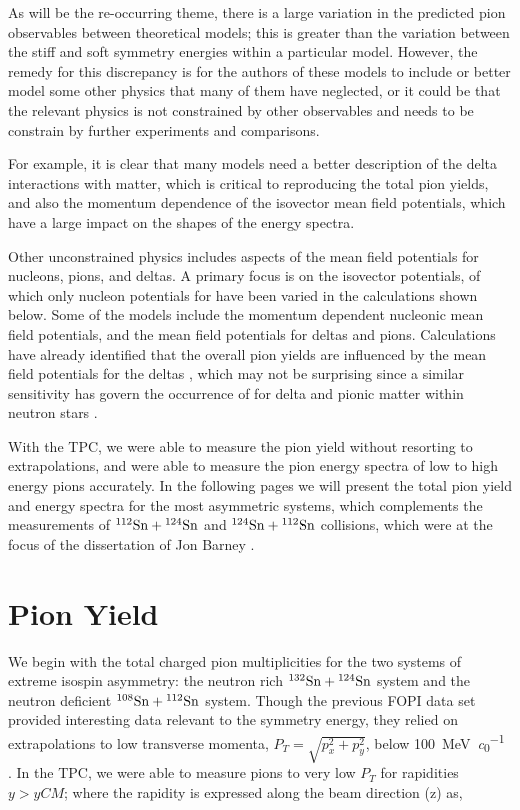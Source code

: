 As will be the re-occurring theme, there is a large variation in the predicted pion observables between theoretical models; this is greater than the variation between the stiff and soft symmetry energies within a particular model. However, the remedy for this discrepancy is for the authors of these models to include or better model some other physics that many of them have neglected, or it could be that the relevant physics is not constrained by other observables and needs to be constrain by further experiments and comparisons.

For example, it is clear that many models need a  better description of the delta interactions with matter, which is critical to reproducing the total pion yields, and also the momentum dependence of the isovector mean field potentials, which have a large impact on the shapes of the energy spectra. 

Other unconstrained physics includes aspects of the mean field potentials for nucleons, pions, and deltas. A primary focus is on the isovector potentials, of which only nucleon potentials for have been varied in the calculations shown below. Some of the models include the momentum dependent nucleonic mean field potentials, and the mean field potentials for deltas and pions. Calculations have already identified that the overall pion yields are influenced by the mean field potentials for the deltas \cite{cozmaPC}, which may not be surprising since a similar sensitivity has govern the occurrence of for delta and pionic matter within neutron stars \cite{deltaNS,pionNS}.  

With the \spirit TPC, we were able to measure the pion yield without resorting to extrapolations, and were able to measure the pion energy spectra of low to high energy pions accurately. In the following pages we will present the total pion yield and energy spectra for the most asymmetric systems, which complements the measurements of ${}^{112}\mathrm{Sn} + {}^{124}\mathrm{Sn}$ and ${}^{124}\mathrm{Sn} + {}^{112}\mathrm{Sn}$ collisions, which were at the focus of the dissertation of Jon Barney \cite{jon}.


\section{Pion Yield}

We begin with the total charged pion multiplicities for the two systems of extreme isospin asymmetry: the neutron rich ${}^{132}\mathrm{Sn} + {}^{124}\mathrm{Sn}$ system and the neutron deficient  ${}^{108}\mathrm{Sn} + {}^{112}\mathrm{Sn}$ system. Though the previous FOPI data set provided interesting data relevant to  the symmetry energy, they relied on extrapolations to low transverse momenta, $P_T = \sqrt{p_x^2 + p_y^2}$, below \SI{100}{\mega\electronvolt\per\clight} \cite{fopi}. In the \spirit TPC, we were able to measure pions to very low $P_T$ for rapidities $y > y{CM}$; where the rapidity is expressed along the beam direction (z) as,

